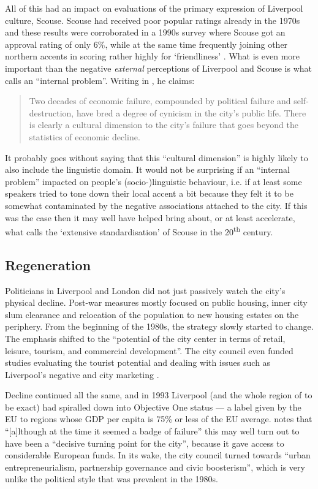 All of this had an impact on evaluations of the primary expression of Liverpool culture, Scouse.
Scouse had received poor popular ratings already in the 1970s and these results were corroborated in a 1990s survey where Scouse got an approval rating of only 6\%, while at the same time frequently joining other northern accents in scoring rather highly for `friendliness' \citep[cf.][166]{wales2006}.
What is even more important than the negative \emph{external} perceptions of Liverpool and Scouse is what \citet[255]{parkinson1990} calls an ``internal  problem''.
Writing in \citeyear{parkinson1990}, he claims: 
	\begin{quote}
		Two decades of economic failure, compounded by political failure and self-destruction, have bred a degree of cynicism in the city's public life. There is clearly a cultural dimension to the city's failure that goes beyond the statistics of economic decline.
	\end{quote}
It probably goes without saying that this ``cultural dimension'' is highly likely to also include the linguistic domain.
It would not be surprising if an ``internal  problem'' impacted on people's (socio-)linguistic behaviour, i.e. if at least some speakers tried to tone down their local accent a bit because they felt it to be somewhat contaminated by the negative associations attached to the city.
If this was the case then it may well have helped bring about, or at least accelerate, what \citet{knowles1978} calls the `extensive standardisation' of Scouse in the 20\textsuperscript{th} century.

		\subsection{Regeneration}\label{sec.hist.20.regen}

Politicians in Liverpool and London did not just passively watch the city's physical decline.
Post-war measures mostly focused on public housing, inner city slum clearance and relocation of the population to new housing estates on the periphery.
From the beginning of the 1980s, the strategy slowly started to change.
The emphasis shifted to the ``potential of the city center in terms of retail, leisure, tourism, and commercial development''.
The city council even funded studies evaluating the tourist potential and dealing with issues such as Liverpool's negative  and city marketing \citep[cf.][250--253]{parkinson1990}.

Decline continued all the same, and in 1993 Liverpool (and the whole region of  to be exact) had spiralled down into Objective One status --- a label given by the EU to regions whose GDP per capita is 75\% or less of the EU average.
\citet[53--54]{belchem2006a} notes that ``[a]lthough at the time it seemed a badge of failure'' this may well turn out to have been a ``decisive turning point for the city'', because it gave access to considerable European funds.
In its wake, the city council turned towards ``urban entrepreneurialism, partnership governance and civic boosterism'', which is very unlike the political style that was prevalent in the 1980s.

